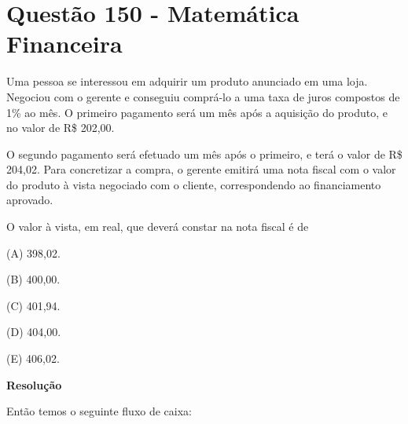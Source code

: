\section{Questão 150 - Matemática Financeira}

Uma pessoa se interessou em adquirir um produto anunciado em uma loja. Negociou com o gerente e conseguiu comprá-lo a uma taxa de juros compostos de 1\% ao mês. O primeiro pagamento será um mês após a aquisição do produto, e no valor de R\$ 202,00.

O segundo pagamento será efetuado um mês após o primeiro, e terá o valor de R\$ 204,02. Para concretizar a compra, o gerente emitirá uma nota fiscal com o valor do produto à vista negociado com o cliente, correspondendo ao financiamento aprovado.

O valor à vista, em real, que deverá constar na nota fiscal é de

(A) 398,02.

(B) 400,00.

(C) 401,94.

(D) 404,00.

(E) 406,02.

\textbf{Resolução}

Então temos o seguinte fluxo de caixa:

